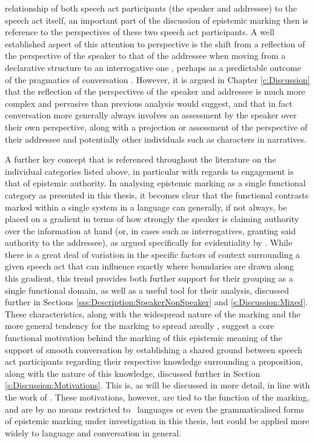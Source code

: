 relationship of both speech act participants (the speaker and addressee) to the speech act itself, an important part of the discussion of epistemic marking then is reference to the perspectives of these two speech act participants. A well established aspect of this attention to perspective is the shift from a reflection of the perspective of the speaker to that of the addressee when moving from a declarative structure to an interrogative one \cites[242]{Aikhenvald2004}{EgoIntro}, perhaps as a predictable outcome of the pragmatics of conversation \cite{Hill2020}. However, it is argued in Chapter \ref{c:Discussion} that the reflection of the perspectives of the speaker and addressee is much more complex and pervasive than previous analysis would suggest, and that in fact conversation more generally always involves an assessment by the speaker over their own perspective, along with a projection or assessment of the perspective of their addressee and potentially other individuals such as characters in narratives. 

A further key concept that is referenced throughout the literature on the individual categories listed above, in particular with regards to engagement \cite{EvansBergqvistSanRoque2018a} is that of epistemic authority. In analysing epistemic marking as a single functional category as presented in this thesis, it becomes clear that the functional contrasts marked within a single system in a language can generally, if not always, be placed on a gradient in terms of how strongly the speaker is claiming authority over the information at hand (or, in cases such as interrogatives, granting said authority to the addressee), as argued specifically for evidentiality by . While there is a great deal of variation in the specific factors of context surrounding a given speech act that can influence exactly where boundaries are drawn along this gradient, this trend provides both further support for their grouping as a single functional domain, as well as a useful tool for their analysis, discussed further in Sections \ref{sss:Description:SpeakerNonSpeaker} and \ref{s:Discussion:Mixed}. These characteristics, along with the widespread nature of the marking and the more general tendency for the marking to spread areally \cite{Aikhenvald2004}, suggest a core functional motivation behind the marking of this epistemic meaning of the support of smooth conversation by establishing a shared ground between speech act participants regarding their respective knowledge surrounding a proposition, along with the nature of this knowledge, discussed further in Section \ref{s:Discussion:Motivations}. This is, as will be discussed in more detail, in line with the work of . These motivations, however, are tied to the function of the marking, and are by no means restricted to \lfam\ languages or even the grammaticalised forms of epistemic marking under investigation in this thesis, but could be applied more widely to language and conversation in general.

